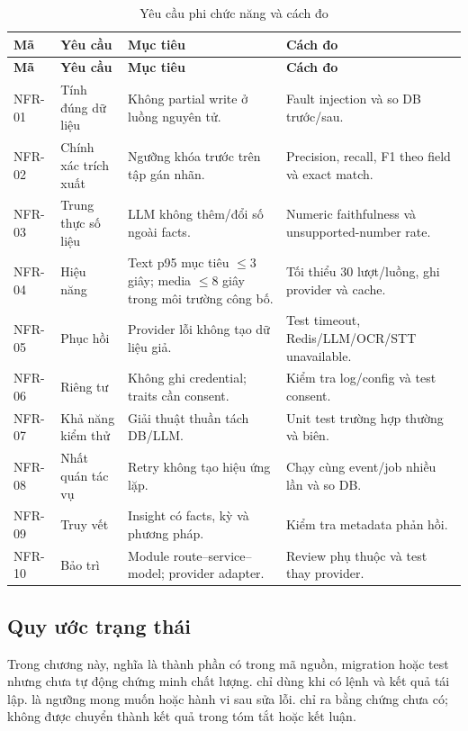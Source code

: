\begin{longtable}{@{}L{1.2cm}L{2.8cm}L{3.5cm}L{5.2cm}@{}}
  \caption{Yêu cầu phi chức năng và cách đo}\label{tab:nfr}\\
  \toprule
  \textbf{Mã} & \textbf{Yêu cầu} & \textbf{Mục tiêu} & \textbf{Cách đo} \\
  \midrule
  \endfirsthead
  \toprule
  \textbf{Mã} & \textbf{Yêu cầu} & \textbf{Mục tiêu} & \textbf{Cách đo} \\
  \midrule
  \endhead
  NFR-01 & Tính đúng dữ liệu & Không partial write ở luồng nguyên tử. & Fault injection và so DB trước/sau. \\
  NFR-02 & Chính xác trích xuất & Ngưỡng khóa trước trên tập gán nhãn. & Precision, recall, F1 theo field và exact match. \\
  NFR-03 & Trung thực số liệu & LLM không thêm/đổi số ngoài facts. & Numeric faithfulness và unsupported-number rate. \\
  NFR-04 & Hiệu năng & Text p95 mục tiêu $\leq3$ giây; media $\leq8$ giây trong môi trường công bố. & Tối thiểu 30 lượt/luồng, ghi provider và cache. \\
  NFR-05 & Phục hồi & Provider lỗi không tạo dữ liệu giả. & Test timeout, Redis/LLM/OCR/STT unavailable. \\
  NFR-06 & Riêng tư & Không ghi credential; traits cần consent. & Kiểm tra log/config và test consent. \\
  NFR-07 & Khả năng kiểm thử & Giải thuật thuần tách DB/LLM. & Unit test trường hợp thường và biên. \\
  NFR-08 & Nhất quán tác vụ & Retry không tạo hiệu ứng lặp. & Chạy cùng event/job nhiều lần và so DB. \\
  NFR-09 & Truy vết & Insight có facts, kỳ và phương pháp. & Kiểm tra metadata phản hồi. \\
  NFR-10 & Bảo trì & Module route--service--model; provider adapter. & Review phụ thuộc và test thay provider. \\
  \bottomrule
\end{longtable}

\subsection{Quy ước trạng thái}

Trong chương này, \statusimplemented{} nghĩa là thành phần có trong mã nguồn, migration hoặc test nhưng chưa tự động chứng minh chất lượng. \statusmeasured{} chỉ dùng khi có lệnh và kết quả tái lập. \statustarget{} là ngưỡng mong muốn hoặc hành vi sau sửa lỗi. \statusmissing{} chỉ ra bằng chứng chưa có; không được chuyển thành kết quả trong tóm tắt hoặc kết luận.


